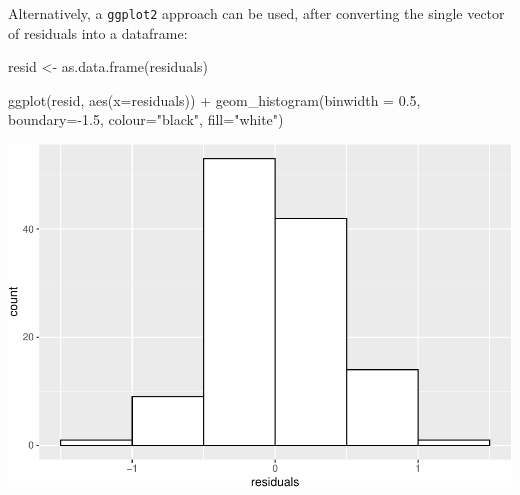 \documentclass[
]{memoir}
\newenvironment{Shaded}{\begin{snugshade}}{\end{snugshade}}
\newcommand{\AttributeTok}[1]{\textcolor[rgb]{0.77,0.63,0.00}{#1}}
\newcommand{\FloatTok}[1]{\textcolor[rgb]{0.00,0.00,0.81}{#1}}
\newcommand{\FunctionTok}[1]{\textcolor[rgb]{0.00,0.00,0.00}{#1}}
\newcommand{\NormalTok}[1]{#1}
\newcommand{\OtherTok}[1]{\textcolor[rgb]{0.56,0.35,0.01}{#1}}
\newcommand{\SpecialCharTok}[1]{\textcolor[rgb]{0.00,0.00,0.00}{#1}}
\newcommand{\StringTok}[1]{\textcolor[rgb]{0.31,0.60,0.02}{#1}}
\begin{document}
Alternatively, a \texttt{ggplot2} approach can be used, after converting the single vector of residuals into a dataframe:

\begin{Shaded}
\begin{Highlighting}[]
\NormalTok{resid }\OtherTok{\textless{}{-}} \FunctionTok{as.data.frame}\NormalTok{(residuals)}

\FunctionTok{ggplot}\NormalTok{(resid, }\FunctionTok{aes}\NormalTok{(}\AttributeTok{x=}\NormalTok{residuals)) }\SpecialCharTok{+} 
  \FunctionTok{geom\_histogram}\NormalTok{(}\AttributeTok{binwidth =} \FloatTok{0.5}\NormalTok{, }\AttributeTok{boundary=}\SpecialCharTok{{-}}\FloatTok{1.5}\NormalTok{, }\AttributeTok{colour=}\StringTok{"black"}\NormalTok{, }\AttributeTok{fill=}\StringTok{"white"}\NormalTok{)}
\end{Highlighting}
\end{Shaded}

\includegraphics{phcm9795-R-notes_files/figure-latex/unnamed-chunk-103-1.pdf}

\begin{Shaded}
\end{Shaded}
\end{document}
